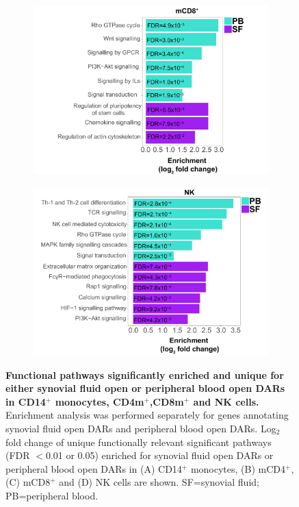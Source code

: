 \begin{figure}[H]
\begin{subfigure}[b]{0.48\textwidth}
\includegraphics[width=\textwidth]{./Results3/pdfs/ATAC_PSA_CD8_pathways_barplot_all_DOCS_proximity_FC}%
\caption{}
\end{subfigure}
\begin{subfigure}[b]{0.48\textwidth} 
\centering
\includegraphics[width=\textwidth]{./Results3/pdfs/ATAC_PSA_NK_pathways_barplot_all_DOCS_proximity_FC}%
\caption{}
\end{subfigure}
\caption[Functional pathways significantly enriched and unique for either synovial fluid open or peripheral blood open DARs in CD14$^+$ monocytes, CD4m$^+$,CD8m$^+$ and NK cells.]{\textbf{Functional pathways significantly enriched and unique for either synovial fluid open or peripheral blood open DARs in CD14$^+$ monocytes, CD4m$^+$,CD8m$^+$ and NK cells.} Enrichment analysis was performed separately for genes annotating synovial fluid open DARs and peripheral blood open DARs. Log$_2$ fold change of unique functionally relevant significant pathways (FDR $<$0.01 or 0.05) enriched for synovial fluid open DARs or peripheral blood open DARs in (A) CD14$^+$ monocytes, (B) mCD4$^+$, (C) mCD8$^+$ and (D) NK cells are shown. SF=synovial fluid; PB=peripheral blood.}
\label{figure:PSA_ATAC_pathway_analysis_all_DOC}
\end{figure}

